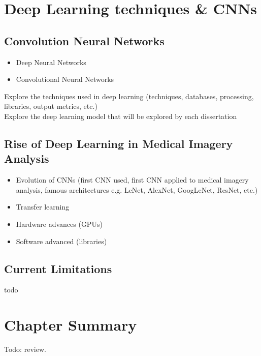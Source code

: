 
\section{Deep Learning techniques \& CNNs}
\label{sec:litsurvey-DLtechniques-CNN}

\subsection{Convolution Neural Networks}

\begin{itemize}
    \item Deep Neural Networks
    \item Convolutional Neural Networks
\end{itemize}

Explore the techniques used in deep learning (techniques, databases, processing, libraries, output metrics, etc.)\\
Explore the deep learning model that will be explored by each dissertation

\subsection{Rise of Deep Learning in Medical Imagery Analysis}

\begin{itemize}
    \item Evolution of CNNs (first CNN used, first CNN applied to medical imagery analysis, famous architectures e.g. LeNet, AlexNet, GoogLeNet, ResNet, etc.)
    \item Transfer learning
    \item Hardware advances (GPUs)
    \item Software advanced (libraries)
\end{itemize}

\subsection{Current Limitations}

todo


\section{Chapter Summary}

Todo: review.
